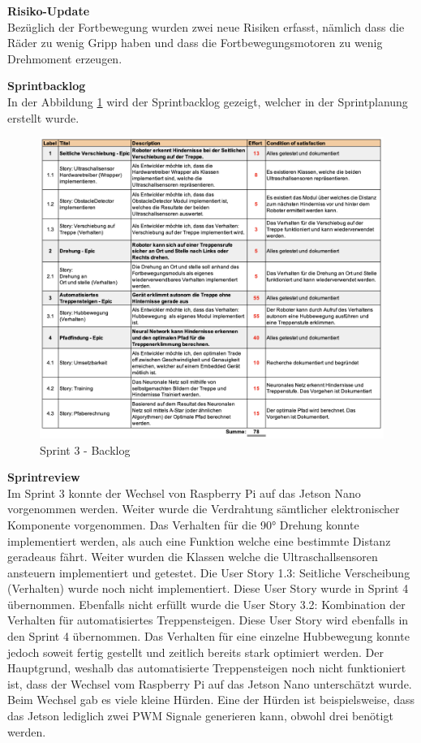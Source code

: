 \textbf{Risiko-Update}\\
Bezüglich der Fortbewegung wurden zwei neue Risiken erfasst, nämlich dass die Räder zu wenig Gripp haben und dass die Fortbewegungsmotoren zu wenig Drehmoment erzeugen.

\textbf{Sprintbacklog}\\
In der Abbildung \ref{fig:sprint-backlog-3} wird der Sprintbacklog gezeigt, welcher in der Sprintplanung erstellt wurde.
\begin{figure}[H]
  \includegraphics[width=1.0\textwidth]{img/projektmanagement/Sprint 3.png}
  \centering
  \caption{Sprint 3 - Backlog}
  \label{fig:sprint-backlog-3}
\end{figure}

\newpage

\textbf{Sprintreview}\\
Im Sprint 3 konnte der Wechsel von Raspberry Pi auf das Jetson Nano vorgenommen werden. Weiter wurde die  Verdrahtung sämtlicher elektronischer Komponente vorgenommen. Das Verhalten für die 90° Drehung konnte implementiert werden, als auch eine Funktion welche eine bestimmte Distanz geradeaus fährt. Weiter wurden die Klassen welche die Ultraschallsensoren ansteuern implementiert und getestet. Die User Story 1.3: Seitliche Verscheibung (Verhalten) wurde noch nicht implementiert. Diese User Story wurde in Sprint 4 übernommen. Ebenfalls nicht erfüllt wurde die User Story 3.2: Kombination der Verhalten für automatisiertes Treppensteigen. Diese User Story wird ebenfalls in den Sprint 4 übernommen. Das Verhalten für eine einzelne Hubbewegung konnte jedoch soweit fertig gestellt und zeitlich bereits stark optimiert werden. Der Hauptgrund, weshalb das automatisierte Treppensteigen noch nicht funktioniert ist, dass der Wechsel vom Raspberry Pi auf das Jetson Nano unterschätzt wurde. Beim Wechsel gab es viele kleine Hürden. Eine der Hürden ist beispielsweise, dass das Jetson lediglich zwei PWM Signale generieren kann, obwohl drei benötigt werden.

